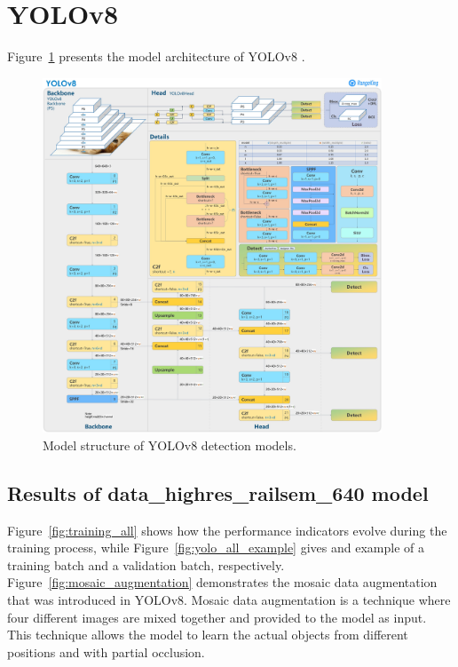 \documentclass[Master,MDS,english]{BASE/twbook} %
\begin{document}
\section{YOLOv8} \label{app:yolo}

Figure~\ref{fig:yolo_architecture} presents the model architecture of YOLOv8 \citep{RangeKing}.

\begin{figure}[h]
\centering
\includegraphics[width=0.9\textwidth]{images/yolo/architecture}
\caption{Model structure of YOLOv8 detection models. }
\label{fig:yolo_architecture}
\end{figure}

\subsection{Results of data\_highres\_railsem\_640 model}

Figure~\ref{fig:training_all} shows how the performance indicators evolve during the training process, while Figure~\ref{fig:yolo_all_example} gives and example of a training batch and a validation batch, respectively.
Figure~\ref{fig:mosaic_augmentation} demonstrates the mosaic data augmentation that was introduced in YOLOv8. 
Mosaic data augmentation is a technique where four different images are mixed together and provided to the model as input. This technique allows the model to learn the actual objects from different positions and with partial occlusion. 
\end{document}
